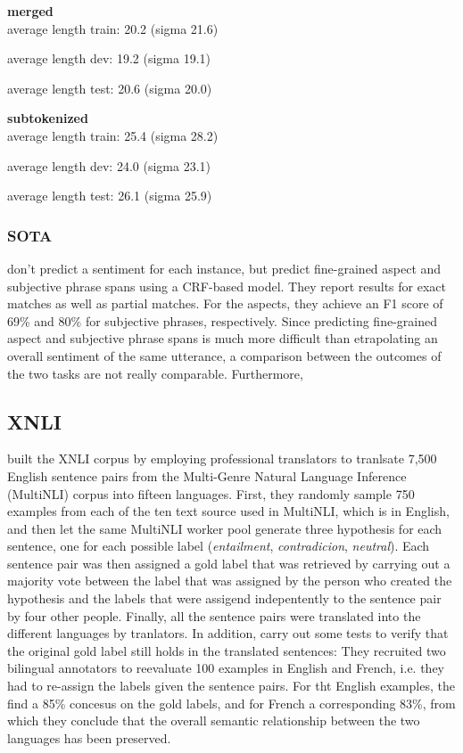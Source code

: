 \textbf{merged} \\
average length train: 20.2 (sigma 21.6)

average length dev: 19.2 (sigma 19.1)

average length test: 20.6 (sigma 20.0)

\textbf{subtokenized} \\

average length train: 25.4 (sigma 28.2)

average length dev: 24.0 (sigma 23.1)

average length test: 26.1 (sigma 25.9)

\subsubsection{SOTA}

\cite{sanger2016scare} don't predict a sentiment for each instance, but predict fine-grained
aspect and subjective phrase spans using a CRF-based model.
They report results for exact matches as well as partial matches.
For the aspects, they achieve an F1 score of 69\% and 80\% for subjective phrases, respectively.
Since predicting fine-grained aspect and subjective phrase spans is much more difficult than
etrapolating an overall sentiment of the same utterance, a comparison between the outcomes of the
two tasks are not really comparable.
Furthermore,




\subsection{XNLI}

\cite{conneau2018xnli} built the XNLI corpus by employing professional translators to tranlsate
7,500 English sentence pairs from the Multi-Genre Natural Language Inference (MultiNLI) corpus
\cite{williams2017broad} into fifteen languages.
First, they randomly sample 750 examples from each of the ten text source used in MultiNLI, which
is in English, and then let the same MultiNLI worker pool generate three hypothesis for each
sentence, one for each possible label (\emph{entailment}, \emph{contradicion}, \emph{neutral}).
Each sentence pair was then assigned a gold label that was retrieved by carrying out a majority
vote between the label that was assigned by the person who created the hypothesis and the labels
that were assigend indepentently to the sentence pair by four other people.
Finally, all the sentence pairs were translated into the different languages by tranlators.
In addition, \cite{conneau2018xnli} carry out some tests to verify that the original gold label
still holds in the translated sentences:
They recruited two bilingual annotators to reevaluate 100 examples in English and French, i.e.
they had to re-assign the labels given the sentence pairs.
For tht English examples, the find a 85\% concesus on the gold labels, and for French a
corresponding 83\%, from which they conclude that the overall semantic relationship between the
two languages has been preserved.


